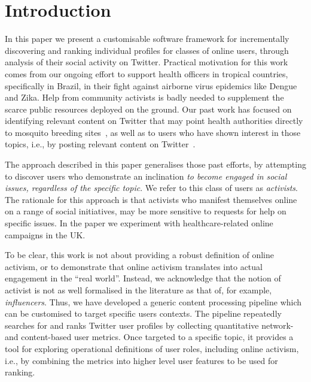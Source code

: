 \section{Introduction}

In this paper we present a customisable software framework for incrementally discovering and ranking individual profiles for classes of online users, through analysis of their social activity on Twitter.
Practical motivation for this work comes from our ongoing effort to support health officers in tropical countries, specifically in Brazil, in their fight against airborne virus epidemics like Dengue and Zika. Help from community activists is badly needed to supplement the scarce public resources deployed on the ground. Our past work has focused on identifying relevant content on Twitter that may point health authorities directly to mosquito breeding sites~\cite{Sousa2018}, as well as to users who have shown interest in those topics, i.e., by posting relevant content on Twitter~\cite{Missier2017}. 

The approach described in this paper generalises those past efforts, by attempting to discover users who demonstrate an inclination \textit{to become engaged in social issues, regardless of the specific topic}.
We refer to this class of users as \textit{activists}.
The rationale for this approach is that activists who manifest themselves online on a range of social initiatives, may be more sensitive to requests for help on specific issues. 
In the paper we experiment with healthcare-related online campaigns in the UK.

To be clear, this work is not about providing a robust definition of online activism, or to demonstrate that online activism translates into actual engagement in the ``real world''.
%
Instead, we acknowledge that the notion of activist is not as well formalised in the literature as that of, for example, \textit{influencers}. 
Thus, we have developed a generic content processing pipeline which can be customised to target specific users contexts. 
The pipeline repeatedly searches for and ranks Twitter user profiles by collecting quantitative network- and content-based user metrics. 
Once targeted to a specific topic, it provides a tool for exploring operational definitions of user roles, including online activism, i.e., by combining the metrics into higher level user features to be used for ranking.

